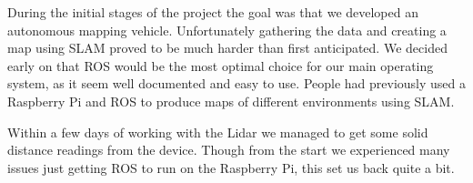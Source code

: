 During the initial stages of the project the goal was that we developed an autonomous mapping vehicle. Unfortunately gathering the data and creating a map using SLAM proved to be much harder than first anticipated. 
We decided early on that ROS would be the most optimal choice for our main operating system, as it seem well documented and easy to use. People had previously used a Raspberry Pi and ROS to produce maps of different environments using SLAM.

Within a few days of working with the Lidar we managed to get some solid distance readings from the device.
Though from the start we experienced many issues just getting ROS to run on the Raspberry Pi, this set us back quite a bit.